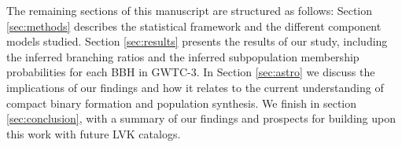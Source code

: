 The remaining sections of this manuscript are structured as follows: Section \ref{sec:methods} describes the statistical framework and the different component models studied. Section \ref{sec:results} presents the results of our study, including the inferred branching ratios and the inferred subpopulation membership probabilities for each BBH in GWTC-3. In Section \ref{sec:astro} we discuss the implications of our findings and how it relates to the current understanding of compact binary formation and population synthesis. We finish in section \ref{sec:conclusion}, with a summary of our findings and prospects for building upon this work with future LVK catalogs.
